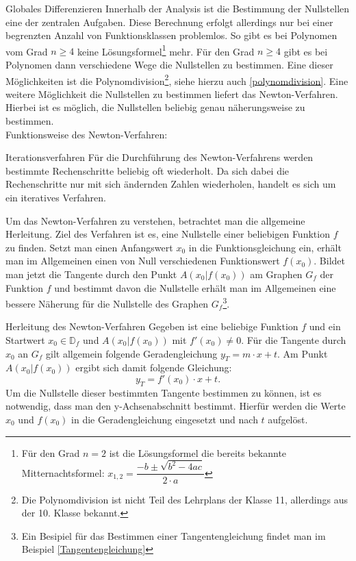 \begin{section}{Globales Differenzieren}
Innerhalb der Analysis ist die Bestimmung der Nullstellen eine der zentralen Aufgaben. Diese Berechnung erfolgt allerdings nur bei einer begrenzten Anzahl von Funktionsklassen problemlos. So gibt es bei Polynomen vom Grad $n\geq 4$ keine Lösungsformel\footnote{Für den Grad $n=2$ ist die Lösungsformel die bereits bekannte Mitternachtsformel: $x_{1,2} = \dfrac{-b\pm \sqrt{b^2 -4ac}}{2\cdot a}$} mehr. Für den Grad $n\geq 4$ gibt es bei Polynomen dann verschiedene Wege die Nullstellen zu bestimmen. Eine dieser Möglichkeiten ist die Polynomdivision\footnote{Die Polynomdivision ist nicht Teil des Lehrplans der Klasse 11, allerdings aus der 10. Klasse bekannt.}, siehe hierzu auch \ref{polynomdivision}. Eine weitere Möglichkeit die Nullstellen zu bestimmen liefert das Newton-Verfahren. Hierbei ist es möglich, die Nullstellen beliebig genau näherungsweise zu bestimmen. \\
Funktionsweise des Newton-Verfahren:
\begin{merke*}{Iterationsverfahren}
  Für die Durchführung des Newton-Verfahrens werden bestimmte Rechenschritte beliebig oft wiederholt. Da sich dabei die Rechenschritte nur mit sich ändernden Zahlen wiederholen, handelt es sich um ein iteratives Verfahren.
\end{merke*}
Um das Newton-Verfahren zu verstehen, betrachtet man die allgemeine Herleitung. Ziel des Verfahren ist es, eine Nullstelle einer beliebigen Funktion $f$ zu finden. Setzt man einen Anfangswert $x_0$ in die Funktionsgleichung ein, erhält man im Allgemeinen einen von Null verschiedenen Funktionswert $f(x_0)$. Bildet man jetzt die Tangente durch den Punkt $A(x_0|f(x_0))$ am Graphen $G_f$ der Funktion $f$ und bestimmt davon die Nullstelle erhält man im Allgemeinen eine bessere Näherung für die Nullstelle des Graphen $G_f$\footnote{Ein Besipiel für das Bestimmen einer Tangentengleichung findet man im Beispiel \ref{Tangentengleichung}}. 
\begin{bsp*}{Herleitung des Newton-Verfahren}
    Gegeben ist eine beliebige Funktion $f$ und ein Startwert $x_0 \in \mathds{D}_f$ und $A(x_0|f(x_0))$ mit $f'(x_0)\neq 0$. Für die Tangente durch $x_0$ an $G_f$ gilt allgemein folgende Geradengleichung $y_T= m\cdot x + t$. Am Punkt $A(x_0|f(x_0))$ ergibt sich damit folgende Gleichung:$$y_T = f'(x_0) \cdot x + t.$$ Um die Nullstelle dieser bestimmten Tangente bestimmen zu können, ist es notwendig, dass man den y-Achsenabschnitt bestimmt. Hierfür werden die Werte $x_0$ und $f(x_0)$ in die Geradengleichung eingesetzt und nach $t$ aufgelöst. 

\end{bsp*}
\end{section}
